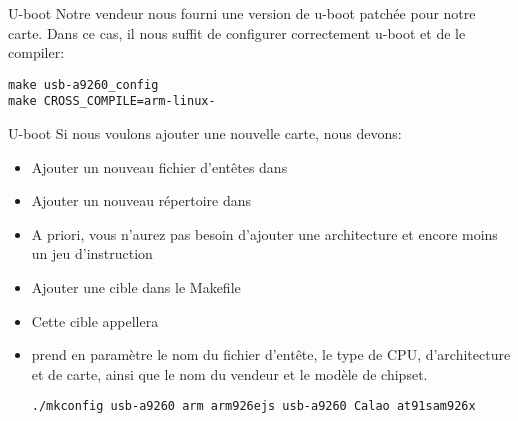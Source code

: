 




\begin{frame}[fragile=singleslide]{U-boot}
  Notre vendeur nous  fourni une version de u-boot  patchée pour notre
  carte. Dans ce cas, il nous suffit de configurer correctement u-boot
  et de le compiler:
  \begin{lstlisting}
make usb-a9260_config
make CROSS_COMPILE=arm-linux-
  \end{lstlisting}
\end{frame}

\begin{frame}[fragile=singleslide]{U-boot}
  Si nous voulons ajouter une nouvelle carte, nous devons:
  \begin{itemize}
  \item Ajouter un nouveau fichier d'entêtes dans 
  \item Ajouter un nouveau répertoire dans 
  \item A priori, vous n'aurez pas besoin d'ajouter une architecture et encore moins un jeu d'instruction
  \item Ajouter une cible dans le Makefile
  \item Cette cible appellera 
  \item {} prend en  paramètre le nom du fichier d'entête,
    le type  de CPU,  d'architecture et de carte,  ainsi que le  nom du
    vendeur et le modèle de chipset.
    \begin{lstlisting}
./mkconfig usb-a9260 arm arm926ejs usb-a9260 Calao at91sam926x
    \end{lstlisting}
  \end{itemize}
\end{frame}

